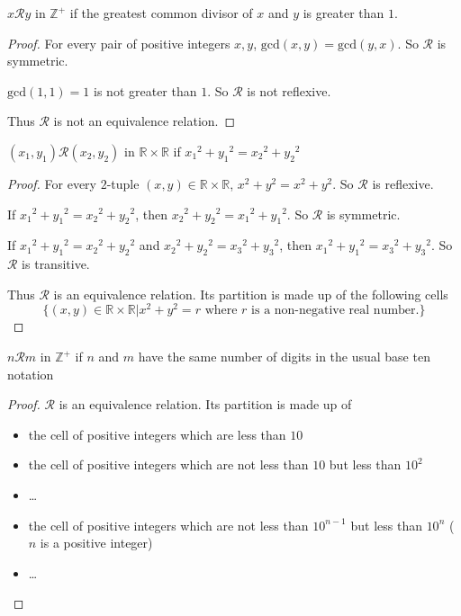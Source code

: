 \newpage
\begin{exercise}
    $x\mathscr{R}y$ in $\mathbb{Z}^{+}$ if the greatest common divisor of $x$ and $y$ is greater than $1$.
\end{exercise}

\begin{proof}
    For every pair of positive integers $x, y$, $\text{gcd}(x, y) = \text{gcd}(y, x)$. So $\mathscr{R}$ is symmetric.

    $\text{gcd}(1, 1) = 1$ is not greater than $1$. So $\mathscr{R}$ is not reflexive.

    Thus $\mathscr{R}$ is not an equivalence relation.
\end{proof}

\newpage
\begin{exercise}
    $(x_{1}, y_{1})\mathscr{R}(x_{2}, y_{2})$ in $\mathbb{R}\times\mathbb{R}$ if ${x_{1}}^{2} + {y_{1}}^{2} = {x_{2}}^{2} + {y_{2}}^{2}$
\end{exercise}

\begin{proof}
    For every $2$-tuple $(x, y) \in \mathbb{R}\times\mathbb{R}$, $x^{2} + y^{2} = x^{2} + y^{2}$. So $\mathscr{R}$ is reflexive.

    If ${x_{1}}^{2} + {y_{1}}^{2} = {x_{2}}^{2} + {y_{2}}^{2}$, then ${x_{2}}^{2} + {y_{2}}^{2} = {x_{1}}^{2} + {y_{1}}^{2}$. So $\mathscr{R}$ is symmetric.

    If ${x_{1}}^{2} + {y_{1}}^{2} = {x_{2}}^{2} + {y_{2}}^{2}$ and ${x_{2}}^{2} + {y_{2}}^{2} = {x_{3}}^{2} + {y_{3}}^{2}$, then ${x_{1}}^{2} + {y_{1}}^{2} = {x_{3}}^{2} + {y_{3}}^{2}$. So $\mathscr{R}$ is transitive.

    Thus $\mathscr{R}$ is an equivalence relation. Its partition is made up of the following cells
    \[
        \{ (x, y) \in \mathbb{R}\times\mathbb{R} \vert x^{2} + y^{2} = r \text{ where $r$ is a non-negative real number.} \}
    \]
\end{proof}

\newpage
\begin{exercise}
    $n\mathscr{R}m$ in $\mathbb{Z}^{+}$ if $n$ and $m$ have the same number of digits in the usual base ten notation
\end{exercise}

\begin{proof}
    $\mathscr{R}$ is an equivalence relation. Its partition is made up of
    \begin{itemize}
        \item the cell of positive integers which are less than $10$
        \item the cell of positive integers which are not less than $10$ but less than $10^{2}$
        \item \ldots
        \item the cell of positive integers which are not less than $10^{n-1}$ but less than $10^{n}$ ($n$ is a positive integer)
        \item \ldots
    \end{itemize}
\end{proof}

